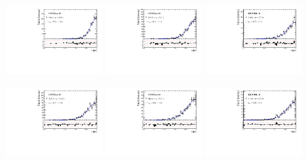 \begin{figure}[h]
\centering
\includegraphics[height=!,width=0.32\textwidth]{figs/Resolution/SignalData_16_bin_1.pdf}
\includegraphics[height=!,width=0.32\textwidth]{figs/Resolution/SignalData_16_bin_2.pdf}
\includegraphics[height=!,width=0.32\textwidth]{figs/Resolution/SignalData_16_bin_3.pdf}

\includegraphics[height=!,width=0.32\textwidth]{figs/Resolution/SignalData_16_bin_4.pdf}
\includegraphics[height=!,width=0.32\textwidth]{figs/Resolution/SignalData_16_bin_5.pdf}
\includegraphics[height=!,width=0.32\textwidth]{figs/Resolution/SignalData_16_bin_6.pdf}


\end{figure}

